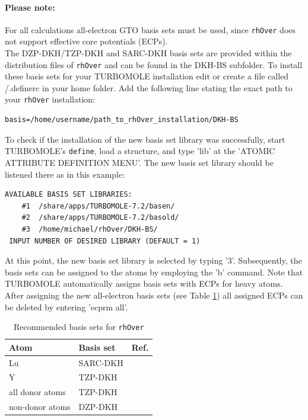 \documentclass[11pt]{article}
\begin{document}
\paragraph{Please note:} For all calculations all-electron GTO basis sets must be used, since \texttt{rhOver} does not support effective core potentials (ECPs). \\

\noindent
The DZP-DKH/TZP-DKH\cite{Jorge2009} and SARC-DKH\cite{Pantazis2009} basis sets are provided within the distribution files of \texttt{rhOver} and can be found in the DKH-BS subfolder.
To install these basis sets for your TURBOMOLE installation edit or create a file called \texttildelow/.definerc in your home folder.
Add the following line stating the exact path to your \texttt{rhOver} installation:

\begin{lstlisting}[frame=single,backgroundcolor=\color{bash},emph={username,path_to_rhOver_installation},emphstyle={\itshape}]
 basis=/home/username/path_to_rhOver_installation/DKH-BS
\end{lstlisting} 

\noindent
To check if the installation of the new basis set library was successfully, start TURBOMOLE's \texttt{define}, load a structure, and type 'lib' at the 'ATOMIC ATTRIBUTE DEFINITION MENU'. The new basis set library should be listened there as in this example:

\begin{lstlisting}[frame=single,backgroundcolor=\color{bash}]
 AVAILABLE BASIS SET LIBRARIES:
    #1  /share/apps/TURBOMOLE-7.2/basen/
    #2  /share/apps/TURBOMOLE-7.2/basold/
    #3  /home/michael/rhOver/DKH-BS/
 INPUT NUMBER OF DESIRED LIBRARY (DEFAULT = 1)
\end{lstlisting}

\noindent
At this point, the new basis set library is selected by typing '3'. Subsequently, the basis sets can be assigned to the atoms by employing the 'b' command. Note that TURBOMOLE automatically assigns basis sets with ECPs for heavy atoms. After assigning the new all-electron basis sets (see Table \ref{tab:basis}) all assigned ECPs can be deleted by entering 'ecprm all'.

\begin{table}[h!]
 \centering
 \caption{Recommended basis sets for \texttt{rhOver}}
 \label{tab:basis}
  \begin{tabular}{lll}
   \toprule
    Atom                     & Basis set & Ref. \\
   \midrule
    Lu                       & SARC-DKH  & \cite{Pantazis2009} \\
    Y                        & TZP-DKH   & \cite{Jorge2009} \\
    all donor atoms          & TZP-DKH   & \cite{Jorge2009} \\
    non-donor atoms          & DZP-DKH   & \cite{Jorge2009} \\
   \bottomrule
  \end{tabular}
\end{table}
\end{document}

